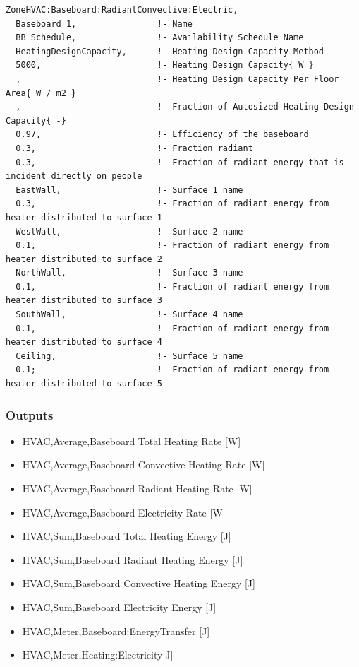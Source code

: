 \begin{lstlisting}
ZoneHVAC:Baseboard:RadiantConvective:Electric,
  Baseboard 1,                !- Name
  BB Schedule,                !- Availability Schedule Name
  HeatingDesignCapacity,      !- Heating Design Capacity Method
  5000,                       !- Heating Design Capacity{ W }
  ,                           !- Heating Design Capacity Per Floor Area{ W / m2 }
  ,                           !- Fraction of Autosized Heating Design Capacity{ -}
  0.97,                       !- Efficiency of the baseboard
  0.3,                        !- Fraction radiant
  0.3,                        !- Fraction of radiant energy that is incident directly on people
  EastWall,                   !- Surface 1 name
  0.3,                        !- Fraction of radiant energy from heater distributed to surface 1
  WestWall,                   !- Surface 2 name
  0.1,                        !- Fraction of radiant energy from heater distributed to surface 2
  NorthWall,                  !- Surface 3 name
  0.1,                        !- Fraction of radiant energy from heater distributed to surface 3
  SouthWall,                  !- Surface 4 name
  0.1,                        !- Fraction of radiant energy from heater distributed to surface 4
  Ceiling,                    !- Surface 5 name
  0.1;                        !- Fraction of radiant energy from heater distributed to surface 5
\end{lstlisting}

\subsubsection{Outputs}\label{outputs-2-017}

\begin{itemize}
\item
  HVAC,Average,Baseboard Total Heating Rate {[}W{]}
\item
  HVAC,Average,Baseboard Convective Heating Rate {[}W{]}
\item
  HVAC,Average,Baseboard Radiant Heating Rate {[}W{]}
\item
  HVAC,Average,Baseboard Electricity Rate {[}W{]}
\item
  HVAC,Sum,Baseboard Total Heating Energy {[}J{]}
\item
  HVAC,Sum,Baseboard Radiant Heating Energy {[}J{]}
\item
  HVAC,Sum,Baseboard Convective Heating Energy {[}J{]}
\item
  HVAC,Sum,Baseboard Electricity Energy {[}J{]}
\item
  HVAC,Meter,Baseboard:EnergyTransfer {[}J{]}
\item
  HVAC,Meter,Heating:Electricity{[}J{]}
\end{itemize}

